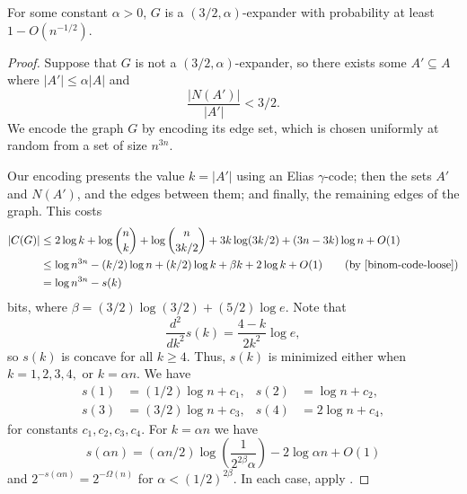\begin{thm}
  For some constant $\alpha > 0$, $G$ is a $(3/2, \alpha)$-expander
  with probability at least $1 - O(n^{-1/2})$.
\end{thm}
\begin{proof}
  Suppose that $G$ is not a $(3/2, \alpha)$-expander, so there exists
  some $A' \subseteq A$ where $|A'| \leq \alpha |A|$ and
  \[\frac{|N(A')|}{|A'|} < 3/2.\]
  We encode the graph $G$ by encoding its edge set, which is chosen
  uniformly at random from a set of size $n^{3n}$.

  Our encoding presents the value $k = |A'|$ using an Elias
  $\gamma$-code; then the sets $A'$ and $N(A')$, and the edges between
  them; and finally, the remaining edges of the graph. This costs
  \begin{align*}
    |C(G)| &\leq 2\log k + \log {n \choose k} + \log {n \choose 3k/2} + 3k \log (3k/2) + (3n - 3k)\log n + O(1) \nonumber\\
           &\leq \log n^{3n} - (k/2)\log n + (k/2)\log k + \beta k + 2 \log k + O(1) \tag{by \eqref{binom-code-loose}}\\
           &= \log n^{3n} - s(k) \nonumber
  \end{align*}
  bits, where $\beta = (3/2) \log (3/2) + (5/2) \log e$. Note that
  \[
  \frac{d^2}{d k^2} s(k) = \frac{4 - k}{2k^2} \log e ,
  \]
  so $s(k)$ is concave for all $k \geq 4$. Thus, $s(k)$ is minimized
  either when $k = 1, 2, 3, 4,$ or $k = \alpha n$. We have
  \begin{align*}
    s(1) &= (1/2)\log n + c_1, &  s(2) &= \log n + c_2, \\
    s(3) &= (3/2) \log n + c_3, & s(4) &= 2 \log n + c_4,
  \end{align*}
  for constants $c_1, c_2, c_3, c_4$. For $k=\alpha n$ we have
  \[
  s(\alpha n) = (\alpha n/2)\log \left(\frac{1}{2^{2 \beta}
      \alpha}\right) - 2 \log \alpha n + O(1)
  \]
  and $2^{-s(\alpha n)} = 2^{-\Omega(n)}$ for $\alpha < (1/2)^{2
    \beta}$. In each case, apply .
\end{proof}
